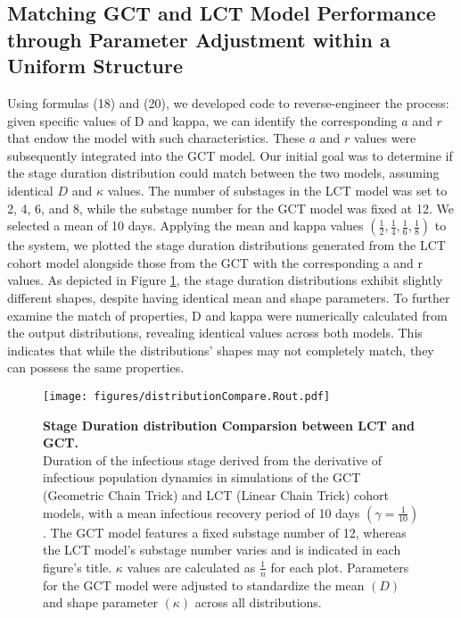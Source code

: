 \documentclass[12pt]{article}
\begin{document}
\subsection{Matching GCT and LCT Model Performance through Parameter Adjustment within a Uniform Structure}

Using formulas (18) and (20), we developed code to reverse-engineer the process: given specific values of D and kappa, we can identify the corresponding $a$ and $r$ that endow the model with such characteristics. These $a$ and $r$ values were subsequently integrated into the GCT model. Our initial goal was to determine if the stage duration distribution could match between the two models, assuming identical $D$ and $\kappa$ values. The number of substages in the LCT model was set to 2, 4, 6, and 8, while the substage number for the GCT model was fixed at 12. We selected a mean of 10 days. Applying the mean and kappa values $\left( \frac{1}{2}, \frac{1}{4}, \frac{1}{6}, \frac{1}{8} \right)$ to the system, we plotted the stage duration distributions generated from the LCT cohort model alongside those from the GCT with the corresponding a and r values. As depicted in Figure \ref{distributionCompare}, the stage duration distributions exhibit slightly different shapes, despite having identical mean and shape parameters. To further examine the match of properties, D and kappa were numerically calculated from the output distributions, revealing identical values across both models. This indicates that while the distributions' shapes may not completely match, they can possess the same properties.

\begin{figure}[h!]
    \centering
    \texttt{[image: figures/distributionCompare.Rout.pdf]}
    \caption{\textbf{Stage Duration distribution Comparsion between LCT and GCT.} \\ Duration of the infectious stage derived from the derivative of infectious population dynamics in simulations of the GCT (Geometric Chain Trick) and LCT (Linear Chain Trick) cohort models, with a mean infectious recovery period of 10 days $(\gamma = \frac{1}{10})$. The GCT model features a fixed substage number of 12, whereas the LCT model's substage number varies and is indicated in each figure's title. $\kappa$ values are calculated as $\frac{1}{n}$ for each plot. Parameters for the GCT model were adjusted to standardize the mean $(D)$ and shape parameter $(\kappa)$ across all distributions.}
    \label{distributionCompare}
\end{figure}
\end{document}
